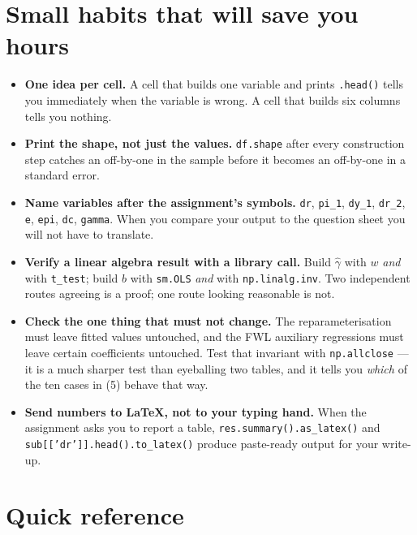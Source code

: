 \documentclass[11pt]{article}
\newcommand{\code}[1]{\texttt{#1}}
\begin{document}
\section{Small habits that will save you hours}

\begin{itemize}[leftmargin=1.4em,itemsep=3pt]
  \item \textbf{One idea per cell.} A cell that builds one variable and prints
        \code{.head()} tells you immediately when the variable is wrong. A cell
        that builds six columns tells you nothing.
  \item \textbf{Print the shape, not just the values.} \code{df.shape} after
        every construction step catches an off-by-one in the sample before it
        becomes an off-by-one in a standard error.
  \item \textbf{Name variables after the assignment's symbols.} \code{dr},
        \code{pi\_1}, \code{dy\_1}, \code{dr\_2}, \code{e}, \code{epi},
        \code{dc}, \code{gamma}. When you compare your output to the question
        sheet you will not have to translate.
  \item \textbf{Verify a linear algebra result with a library call.} Build
        $\hat\gamma$ with $w$ \emph{and} with \code{t\_test}; build $b$ with
        \code{sm.OLS} \emph{and} with \code{np.linalg.inv}. Two independent
        routes agreeing is a proof; one route looking reasonable is not.
  \item \textbf{Check the one thing that must not change.} The reparameterisation
        must leave fitted values untouched, and the FWL auxiliary regressions
        must leave certain coefficients untouched. Test that invariant with
        \code{np.allclose} --- it is a much sharper test than eyeballing two
        tables, and it tells you \emph{which} of the ten cases in (5) behave
        that way.
  \item \textbf{Send numbers to LaTeX, not to your typing hand.} When the
        assignment asks you to report a table, \code{res.summary().as\_latex()}
        and \code{sub[['dr']].head().to\_latex()} produce paste-ready output for
        your write-up.
\end{itemize}

\section{Quick reference}
\end{document}
